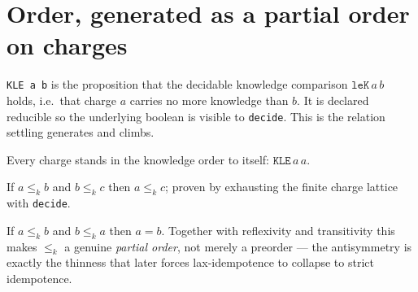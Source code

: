 \section{Order, generated as a partial order on charges}
\begin{proposition}\label{thm:kle}\leanok{}
\texttt{KLE a b} is the proposition that the decidable knowledge comparison
$\texttt{leK}\,a\,b$ holds, i.e.\ that charge $a$ carries no more knowledge than
$b$. It is declared reducible so the underlying boolean is visible to
\texttt{decide}. This is the relation settling generates and climbs.
\end{proposition}
\begin{theorem}[$\le_k$ is reflexive]\label{thm:kle-refl}\leanok{}
Every charge stands in the knowledge order to itself: $\texttt{KLE}\,a\,a$.
\end{theorem}
\begin{theorem}[$\le_k$ is transitive]\label{thm:kle-trans}\leanok{}
If $a \le_k b$ and $b \le_k c$ then $a \le_k c$; proven by exhausting the
finite charge lattice with \texttt{decide}.
\end{theorem}
\begin{theorem}[$\le_k$ is antisymmetric]\label{thm:kle-antisymm}\leanok{}
If $a \le_k b$ and $b \le_k a$ then $a = b$. Together with reflexivity and
transitivity this makes $\le_k$ a genuine \emph{partial order}, not merely a
preorder --- the antisymmetry is exactly the thinness that later forces
lax-idempotence to collapse to strict idempotence.
\end{theorem}
